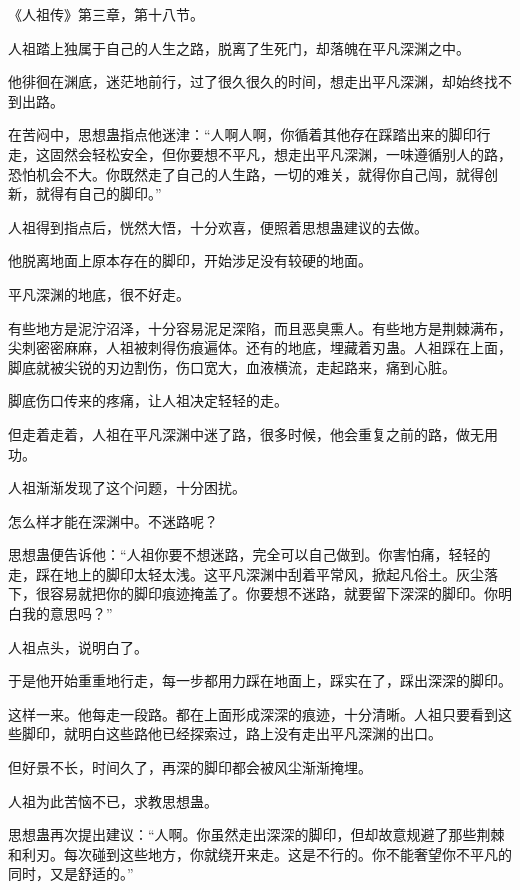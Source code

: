 
\begin{this_body}



《人祖传》第三章，第十八节。

人祖踏上独属于自己的人生之路，脱离了生死门，却落魄在平凡深渊之中。

他徘徊在渊底，迷茫地前行，过了很久很久的时间，想走出平凡深渊，却始终找不到出路。

在苦闷中，思想蛊指点他迷津：“人啊人啊，你循着其他存在踩踏出来的脚印行走，这固然会轻松安全，但你要想不平凡，想走出平凡深渊，一味遵循别人的路，恐怕机会不大。你既然走了自己的人生路，一切的难关，就得你自己闯，就得创新，就得有自己的脚印。”

人祖得到指点后，恍然大悟，十分欢喜，便照着思想蛊建议的去做。

他脱离地面上原本存在的脚印，开始涉足没有较硬的地面。

平凡深渊的地底，很不好走。

有些地方是泥泞沼泽，十分容易泥足深陷，而且恶臭熏人。有些地方是荆棘满布，尖刺密密麻麻，人祖被刺得伤痕遍体。还有的地底，埋藏着刃蛊。人祖踩在上面，脚底就被尖锐的刃边割伤，伤口宽大，血液横流，走起路来，痛到心脏。

脚底伤口传来的疼痛，让人祖决定轻轻的走。

但走着走着，人祖在平凡深渊中迷了路，很多时候，他会重复之前的路，做无用功。

人祖渐渐发现了这个问题，十分困扰。

怎么样才能在深渊中。不迷路呢？

思想蛊便告诉他：“人祖你要不想迷路，完全可以自己做到。你害怕痛，轻轻的走，踩在地上的脚印太轻太浅。这平凡深渊中刮着平常风，掀起凡俗土。灰尘落下，很容易就把你的脚印痕迹掩盖了。你要想不迷路，就要留下深深的脚印。你明白我的意思吗？”

人祖点头，说明白了。

于是他开始重重地行走，每一步都用力踩在地面上，踩实在了，踩出深深的脚印。

这样一来。他每走一段路。都在上面形成深深的痕迹，十分清晰。人祖只要看到这些脚印，就明白这些路他已经探索过，路上没有走出平凡深渊的出口。

但好景不长，时间久了，再深的脚印都会被风尘渐渐掩埋。

人祖为此苦恼不已，求教思想蛊。

思想蛊再次提出建议：“人啊。你虽然走出深深的脚印，但却故意规避了那些荆棘和利刃。每次碰到这些地方，你就绕开来走。这是不行的。你不能奢望你不平凡的同时，又是舒适的。”


\end{this_body}
